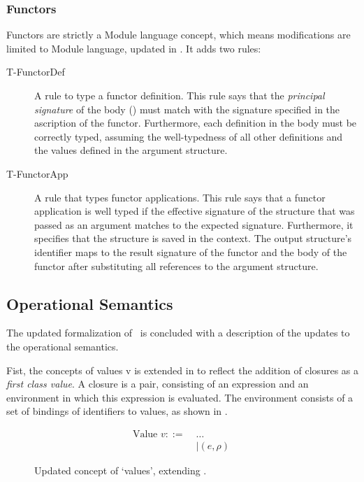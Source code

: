 \subsubsection{Functors}
Functors are strictly a Module language concept, which means modifications are limited to Module language, updated in .
It adds two rules:
\begin{description}
\item[T-FunctorDef]
A rule to type a functor definition.
This rule says that the \emph{principal signature} of the body () must match with the signature specified in the ascription of the functor.
Furthermore, each definition in the body must be correctly typed, assuming the well-typedness of all other definitions and the values defined in the argument structure. 
\item[T-FunctorApp]
A rule that types functor applications.
This rule says that a functor application is well typed if the effective signature of the structure that was passed as an argument matches to the expected signature.
Furthermore, it specifies that the structure is saved in the context.
The output structure's identifier maps to the result signature of the functor and the body of the functor after substituting all references to the argument structure.
\end{description}



\subsection{Operational Semantics}
The updated formalization of \MiniML\ is concluded with a description of the updates to the operational semantics.

Fist, the concepts of values v is extended in  to reflect the addition of closures as a \emph{first class value}.
A closure is a pair, consisting of an expression and an environment in which this expression is evaluated.
The environment consists of a set of bindings of identifiers to values, as shown in .

\begin{figure}[htb]
\begin{align*}
\text{Value }v ::=\;& \ldots \\
&| (e, \rho)\ 
\end{align*}
\caption[Updated Value Concept]{Updated concept of `values', extending .\label{fig:UpdatedValues}}
\end{figure}

